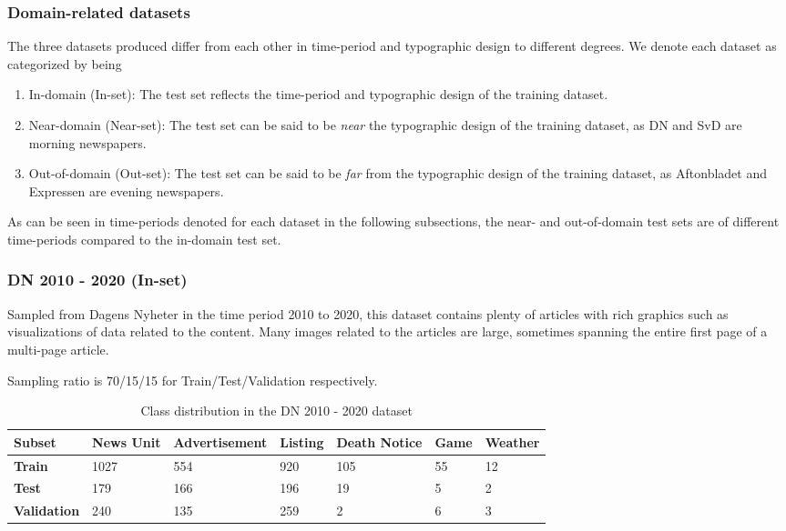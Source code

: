 \documentclass[oneside, english, bibtex]{kththesis}
\begin{document}
\subsubsection{Domain-related datasets}
\label{subsub:domain}

The three datasets produced differ from each other in time-period and typographic design to different degrees.
We denote each dataset as categorized by being 

\begin{enumerate}
\item In-domain (In-set): The test set reflects the time-period and typographic design of the training dataset.
\item Near-domain (Near-set): The test set can be said to be \textit{near} the typographic design of the training dataset, as DN and SvD are morning newspapers.
\item Out-of-domain (Out-set): The test set can be said to be \textit{far} from the typographic design of the training dataset, as Aftonbladet and Expressen are evening newspapers.
\end{enumerate} 

As can be seen in time-periods denoted for each dataset in the following subsections, the near- and out-of-domain test sets are of different time-periods compared to the in-domain test set.

\subsubsection{DN 2010 - 2020 (In-set)}
\label{subsub:inset}

Sampled from Dagens Nyheter in the time period 2010 to 2020,
this dataset contains plenty of articles with rich graphics such as visualizations of data related to the content.
Many images related to the articles are large, sometimes spanning the entire first page of a multi-page article.

Sampling ratio is 70/15/15 for Train/Test/Validation respectively.

\begin{table}[H]
  \begin{center}
    \caption{Class distribution in the DN 2010 - 2020 dataset}
    \label{tab:trainclassdist}
    \begin{tabular}{l|l|l|l|l|l|l} %
    \textbf{Subset} & \textbf{News Unit} & \textbf{Advertisement} & \textbf{Listing} & \textbf{Death Notice} & \textbf{Game} & \textbf{Weather}  \\
    \hline
    \textbf{Train} & 1027 & 554 & 920 & 105 & 55 & 12 \\    \hline
    \textbf{Test} & 179 & 166 & 196 & 19 & 5 & 2 \\    \hline
    \textbf{Validation} & 240 & 135 & 259 & 2 & 6 & 3 \\    \hline
    \end{tabular}
  \end{center}
\end{table}
\end{document}
